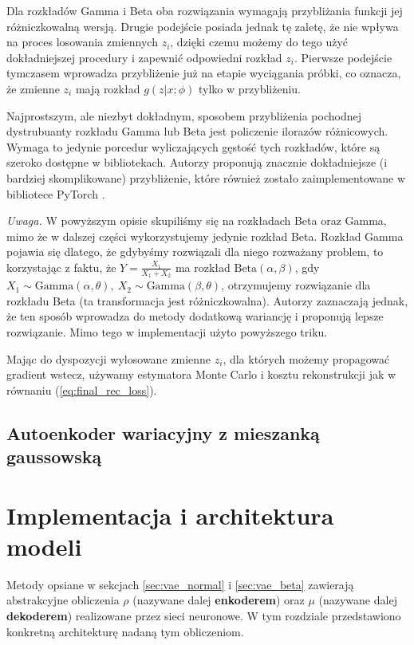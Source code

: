 \documentclass{iithesis}
\begin{document}
Dla rozkładów Gamma i Beta oba rozwiązania wymagają przybliżania funkcji
jej różniczkowalną wersją. Drugie podejście posiada jednak tę zaletę,
że nie wpływa na proces losowania zmiennych $z_i$, dzięki czemu możemy do tego użyć
dokładniejszej procedury i zapewnić odpowiedni rozkład $z_i$. Pierwsze podejście
tymczasem wprowadza przybliżenie już na etapie wyciągania próbki, co oznacza, że zmienne
$z_i$ mają rozkład $g(z|x;\phi)$ tylko w przybliżeniu.

Najprostszym, ale niezbyt dokładnym, sposobem przybliżenia pochodnej dystrubuanty
rozkładu Gamma lub Beta jest policzenie ilorazów różnicowych.
Wymaga to jedynie porcedur wyliczających gęstość tych rozkładów,
które są szeroko dostępne w bibliotekach.
Autorzy \cite{pathwise_gradients} proponują znacznie dokładniejsze (i bardziej skomplikowane)
przybliżenie, które również zostało zaimplementowane w bibliotece PyTorch \cite{pytorch}.

\noindent \textit{Uwaga.} W powyższym opisie skupiliśmy się na rozkładach Beta oraz Gamma,
mimo że w dalszej części wykorzystujemy jedynie rozkład Beta. Rozkład Gamma pojawia się dlatego,
że gdybyśmy rozwiązali dla niego rozważany problem, to korzystając z faktu, że $Y = \frac{X_1}{X_1+X_2}$
ma rozkład $\text{Beta}(\alpha,\beta)$, gdy $X_1 \sim \text{Gamma}(\alpha,\theta),\ X_2 \sim \text{Gamma}(\beta,\theta)$,
otrzymujemy rozwiązanie dla rozkładu Beta (ta transformacja jest różniczkowalna).
Autorzy \cite{pathwise_gradients} zaznaczają jednak, że ten sposób wprowadza do metody dodatkową wariancję
i proponują lepsze rozwiązanie. Mimo tego w implementacji użyto powyższego triku.

Mając do dyspozycji wylosowane zmienne $z_i$, dla których możemy propagować gradient
wstecz, używamy estymatora Monte Carlo i kosztu rekonstrukcji jak w równaniu (\ref{eq:final_rec_loss}).

\section{Autoenkoder wariacyjny z mieszanką gaussowską}

\chapter{Implementacja i architektura modeli}
Metody opsiane w sekcjach \ref{sec:vae_normal} i \ref{sec:vae_beta} zawierają
abstrakcyjne obliczenia $\rho$ (nazywane dalej \textbf{enkoderem}) oraz $\mu$
(nazywane dalej \textbf{dekoderem}) realizowane przez sieci neuronowe.
W tym rozdziale przedstawiono konkretną architekturę nadaną tym obliczeniom.
\end{document}
